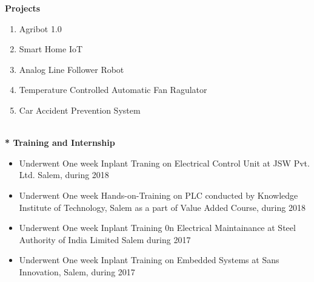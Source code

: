 \documentclass{article}
\begin{document}
	\Large \textbf{Projects}
\begin{enumerate}
	\item Agribot 1.0
	\item Smart Home IoT
	\item Analog Line Follower Robot
	\item Temperature Controlled Automatic Fan Ragulator
	\item Car Accident Prevention System
\end{enumerate}

\Large \textbf{\\* Training and Internship}\

\begin{itemize}
	\item Underwent One week Inplant Traning on Electrical Control Unit at JSW Pvt. Ltd. Salem, during 2018
	\item Underwent One week Hands-on-Training on PLC conducted by Knowledge Institute of Technology, Salem as a part of Value Added Course, during 2018 
	\item Underwent One week Inplant Training 0n Electrical Maintainance at Steel Authority of India Limited Salem during 2017
	\item Underwent One week Inplant Training on Embedded Systems at Sans Innovation, Salem, during 2017 
\end{itemize}
\end{document}
